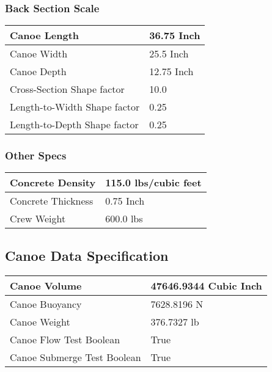 \documentclass{article}%
\begin{document}
%
\subsubsection{Back Section Scale}%
\label{ssubsec:BackSectionScale}%
\renewcommand{\arraystretch}{1.5}%
\begin{tabular}{|l|l|}%
\hline%
Canoe Length&36.75 Inch\\%
\hline%
Canoe Width&25.5 Inch\\%
\hline%
Canoe Depth&12.75 Inch\\%
\hline%
Cross{-}Section Shape factor&10.0\\%
\hline%
Length{-}to{-}Width Shape factor&0.25\\%
\hline%
Length{-}to{-}Depth Shape factor&0.25\\%
\hline%
\end{tabular}

%
\subsubsection{Other Specs}%
\label{ssubsec:OtherSpecs}%
\renewcommand{\arraystretch}{1.5}%
\begin{tabular}{|l|l|}%
\hline%
Concrete Density&115.0 lbs/cubic feet\\%
\hline%
Concrete Thickness&0.75 Inch\\%
\hline%
Crew Weight&600.0 lbs\\%
\hline%
\end{tabular}

%
\subsection{Canoe Data Specification}%
\label{subsec:CanoeDataSpecification}%
\begin{tabular}{|l|l|}%
\hline%
Canoe Volume&47646.9344 Cubic Inch\\%
\hline%
Canoe Buoyancy&7628.8196 N\\%
\hline%
Canoe Weight&376.7327 lb\\%
\hline%
Canoe Flow Test Boolean&True \\%
\hline%
Canoe Submerge Test Boolean&True \\%
\hline%
\end{tabular}

%
\end{document}
